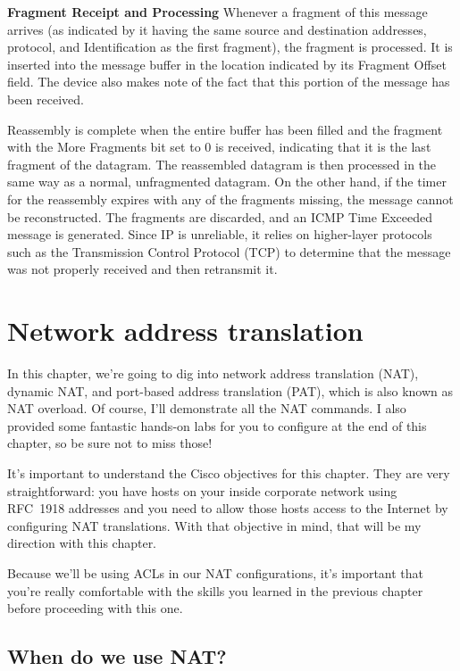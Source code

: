 \documentclass[b5paper,11pt]{memoir}
\begin{document}
{\textbf{Fragment Receipt and Processing}} Whenever a fragment of this
message arrives (as indicated by it having the same source and
destination addresses, protocol, and Identification as the first
fragment), the fragment is processed. It is inserted into the message
buffer in the location indicated by its Fragment Offset field. The
device also makes note of the fact that this portion of the message has
been received.

Reassembly is complete when the entire buffer has been filled and the
fragment with the More Fragments bit set to 0 is received, indicating
that it is the last fragment of the datagram. The reassembled datagram
is then processed in the same way as a normal, unfragmented datagram. On
the other hand, if the timer for the reassembly expires with any of the
fragments missing, the message cannot be reconstructed. The fragments
are discarded, and an ICMP Time Exceeded message is generated. Since IP
is unreliable, it relies on higher-layer protocols such as the
Transmission Control Protocol (TCP) to determine that the message was
not properly received and then retransmit it.


\chapter{Network address translation}
\label{chap:nat}

In this chapter, we're going to dig into network address translation (NAT), dynamic NAT, and port-based address translation (PAT), which is also known as NAT overload.
Of course, I'll demonstrate all the NAT commands.
I also provided some fantastic hands-on labs for you to configure at the end of this chapter, so be sure not to miss those!

It's important to understand the Cisco objectives for this chapter. They are very straightforward: you have hosts on your inside corporate
network using RFC~1918 addresses and you need to allow those hosts access to the Internet by configuring NAT translations. With that
objective in mind, that will be my direction with this chapter.

Because we'll be using ACLs in our NAT configurations, it's important
that you're really comfortable with the skills you learned in the
previous chapter before proceeding with this one.

\section{When do we use NAT?}
\end{document}
